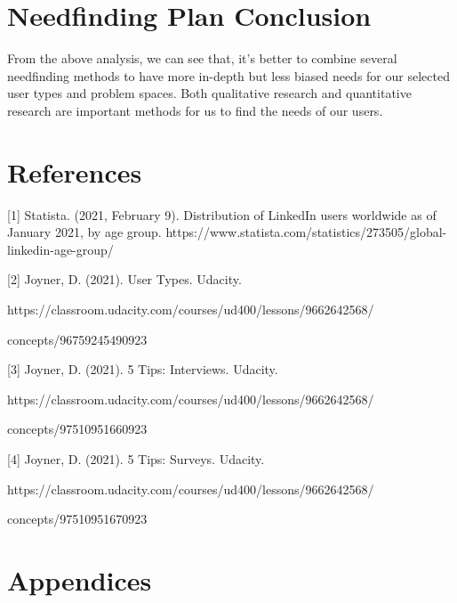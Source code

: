 \documentclass[
	letterpaper, %
]{jdf}
\begin{document}
\section{Needfinding Plan Conclusion}
From the above analysis, we can see that, it's better to combine several needfinding methods to have more in-depth but less biased needs for our selected user types and problem spaces. Both qualitative research and quantitative research are important methods for us to find the needs of our users.

\section{References}
[1] Statista. (2021, February 9). Distribution of LinkedIn users worldwide as of January 2021, by age group. https://www.statista.com/statistics/273505/global-linkedin-age-group/

[2] Joyner, D. (2021). User Types. Udacity.

https://classroom.udacity.com/courses/ud400/lessons/9662642568/

concepts/96759245490923

[3] Joyner, D. (2021). 5 Tips: Interviews. Udacity.

https://classroom.udacity.com/courses/ud400/lessons/9662642568/

concepts/97510951660923

[4] Joyner, D. (2021). 5 Tips: Surveys. Udacity.

https://classroom.udacity.com/courses/ud400/lessons/9662642568/

concepts/97510951670923

\section{Appendices}
\end{document}
